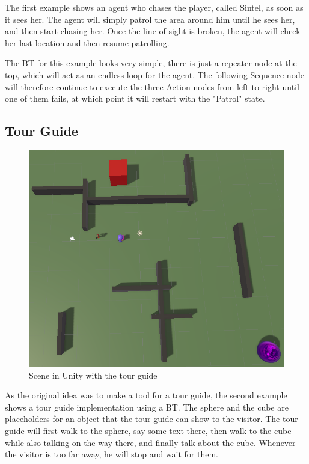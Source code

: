 The first example shows an agent who chases the player, called Sintel, as soon as it sees her. The agent will simply patrol the area around him until he sees her, and then start chasing her. Once the line of sight is broken, the agent will check her last location and then resume patrolling.

The BT for this example looks very simple, there is just a repeater node at the top, which will act as an endless loop for the agent. The following Sequence node will therefore continue to execute the three Action nodes from left to right until one of them fails, at which point it will restart with the "Patrol" state.

\subsection{Tour Guide}
\label{subsec:projectevolution_exampleimplementations_tourguide}

\begin{figure}[H]
	\centering
		\includegraphics[scale=0.35]{images/behaviour_tree_scene_tour_guide.png}
	\caption{Scene in Unity with the tour guide}
	\label{fig:behaviour_tree_scene_tour_guide}
\end{figure}

As the original idea was to make a tool for a tour guide, the second example shows a tour guide implementation using a BT. The sphere and the cube are placeholders for an object that the tour guide can show to the visitor. The tour guide will first walk to the sphere, say some text there, then walk to the cube while also talking on the way there, and finally talk about the cube. Whenever the visitor is too far away, he will stop and wait for them.

